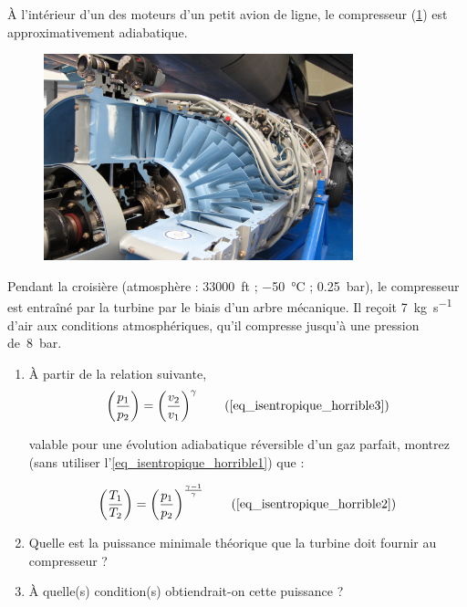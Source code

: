 	À l’intérieur d’un des moteurs d’un petit avion de ligne, le compresseur (\cref{fig_exo_compresseur_turbojet}) est approximativement adiabatique.	
	\begin{figure}
		\begin{center}
			\includegraphics[width=0.8\textwidth]{images/atar_compressor.jpg}
		\end{center}
		\label{fig_exo_compresseur_turbojet}
	\end{figure}
	
	Pendant la croisière (atmosphère : \SI{33 000}{ft} ; \SI{-50}{\degreeCelsius} ; \SI{0,25}{\bar}), le compresseur est entraîné par la turbine par le biais d’un arbre mécanique. Il reçoit \SI{7}{\kilogram\per\second} d’air aux conditions atmosphériques, qu’il compresse jusqu’à une pression de~\SI{8}{\bar}.
	
	\begin{enumerate}
		\item À partir de la relation suivante,
			\begin{equation}
				\left( \frac{p_1}{p_2} \right)	= \left( \frac{v_2}{v_1} \right)^{\gamma} \tag{\ref{eq_isentropique_horrible3}}
			\end{equation}
							
			valable pour une évolution adiabatique réversible d’un gaz parfait, montrez (sans utiliser l’\cref{eq_isentropique_horrible1}) que :
			
			\begin{equation}
				\left( \frac{T_1}{T_2} \right)	=  \left( \frac{p_1}{p_2} \right)^{\frac{\gamma -1}{\gamma}}  \tag{\ref{eq_isentropique_horrible2}}
			\end{equation}
			
		\item Quelle est la puissance minimale théorique que la turbine doit fournir au compresseur ? 
		\item À quelle(s) condition(s) obtiendrait-on cette puissance ?
	\end{enumerate}
	

